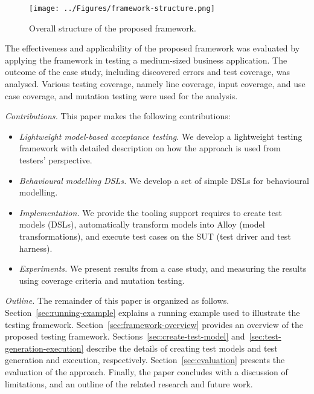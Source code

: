 \begin{figure}[!t]
\centering
\texttt{[image: ../Figures/framework-structure.png]}
\caption{Overall structure of the proposed framework.}
\label{fig:framework-structure}
\end{figure}

The effectiveness and applicability of the proposed framework was evaluated by applying the framework in testing a medium-sized business application. The outcome of the case study, including discovered errors and test coverage, was analysed. Various testing coverage, namely line coverage, input coverage, and use case coverage, and mutation testing were used for the analysis.


\textit{Contributions.} This paper makes the following
contributions:
\begin{itemize}
	\item \textit{Lightweight model-based acceptance testing.} We develop a lightweight testing framework with detailed description on how the approach is used from testers' perspective.
	
	\item \textit{Behavioural modelling DSLs.} We develop a set of simple DSLs for behavioural modelling.
	
	\item \textit{Implementation.} We provide the tooling support requires to create test models (DSLs), automatically transform models into Alloy (model transformations), and execute test cases on the SUT (test driver and test harness).
	
	\item \textit{Experiments. } We present results from a case study, and measuring the results using coverage criteria and mutation testing.
\end{itemize}

\textit{Outline.} The remainder of this paper is organized as follows.  %
Section~\ref{sec:running-example} explains a running example used to illustrate the testing framework. Section~\ref{sec:framework-overview} provides an overview of the proposed testing framework. Sections~\ref{sec:create-test-model} and~\ref{sec:test-generation-execution} describe the details of creating test models and test generation and execution, respectively. Section~\ref{sec:evaluation} presents the evaluation of the approach. Finally, the paper concludes with a discussion of limitations, and an outline of the related research and future work.
